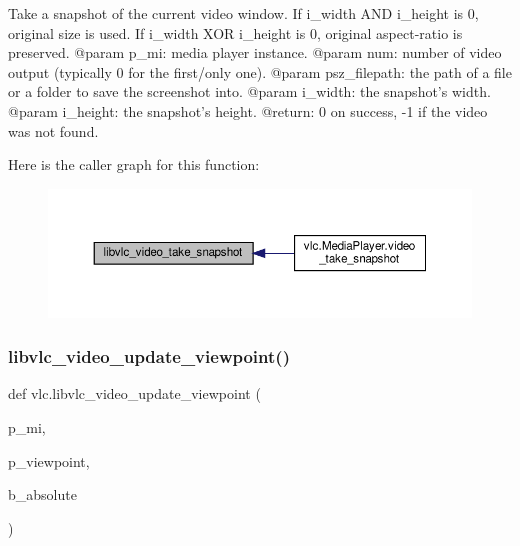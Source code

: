 \begin{DoxyVerb}Take a snapshot of the current video window.
If i_width AND i_height is 0, original size is used.
If i_width XOR i_height is 0, original aspect-ratio is preserved.
@param p_mi: media player instance.
@param num: number of video output (typically 0 for the first/only one).
@param psz_filepath: the path of a file or a folder to save the screenshot into.
@param i_width: the snapshot's width.
@param i_height: the snapshot's height.
@return: 0 on success, -1 if the video was not found.
\end{DoxyVerb}
 Here is the caller graph for this function\+:
\nopagebreak
\begin{figure}[H]
\begin{center}
\leavevmode
\includegraphics[width=350pt]{namespacevlc_a0c671a906d1cdfe68ca7e1cb644a3bee_icgraph}
\end{center}
\end{figure}
\mbox{\label{namespacevlc_a3950e442a1f8e253586957f4e0c7dcd0}} 
\subsubsection{\texorpdfstring{libvlc\+\_\+video\+\_\+update\+\_\+viewpoint()}{libvlc\_video\_update\_viewpoint()}}
{\footnotesize\ttfamily def vlc.\+libvlc\+\_\+video\+\_\+update\+\_\+viewpoint (\begin{DoxyParamCaption}\item[{}]{p\+\_\+mi,  }\item[{}]{p\+\_\+viewpoint,  }\item[{}]{b\+\_\+absolute }\end{DoxyParamCaption})}

